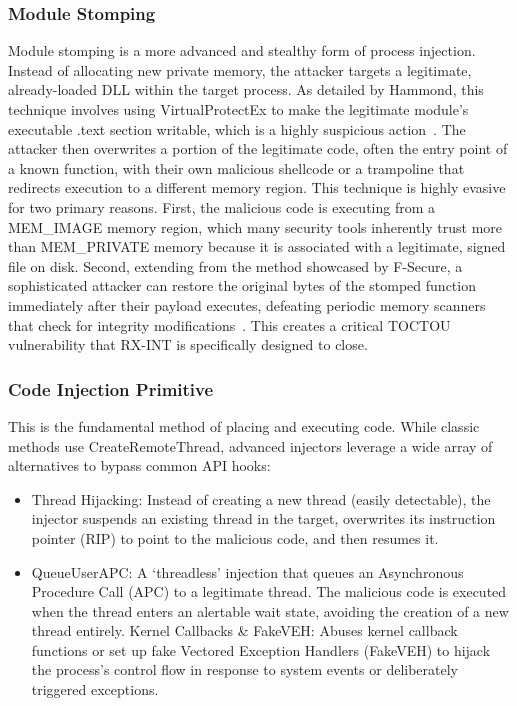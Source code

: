 \documentclass[journal]{IEEEtran}
\begin{document}
\subsubsection{Module Stomping}
Module stomping is a more advanced and stealthy form of process injection. Instead of allocating new private memory, the attacker targets a legitimate, already-loaded DLL within the target process. As detailed by Hammond, this technique involves using VirtualProtectEx to make the legitimate module's executable .text section writable, which is a highly suspicious action~\cite{Orr2019}. The attacker then overwrites a portion of the legitimate code, often the entry point of a known function, with their own malicious shellcode or a trampoline that redirects execution to a different memory region.
This technique is highly evasive for two primary reasons. First, the malicious code is executing from a MEM\_IMAGE memory region, which many security tools inherently trust more than MEM\_PRIVATE memory because it is associated with a legitimate, signed file on disk. Second, extending from the method showcased by F-Secure, a sophisticated attacker can restore the original bytes of the stomped function immediately after their payload executes, defeating periodic memory scanners that check for integrity modifications~\cite{Orr2019}. This creates a critical TOCTOU vulnerability that RX-INT is specifically designed to close.
\subsubsection{Code Injection Primitive}
This is the fundamental method of placing and executing code. While classic methods use CreateRemoteThread, advanced injectors leverage a wide array of alternatives to bypass common API hooks:
\begin{itemize}
\item Thread Hijacking: Instead of creating a new thread (easily detectable), the injector suspends an existing thread in the target, overwrites its instruction pointer (RIP) to point to the malicious code, and then resumes it.
\item QueueUserAPC: A `threadless' injection that queues an Asynchronous Procedure Call (APC) to a legitimate thread. The malicious code is executed when the thread enters an alertable wait state, avoiding the creation of a new thread entirely. Kernel Callbacks \& FakeVEH: Abuses kernel callback functions or set up fake Vectored Exception Handlers (FakeVEH) to hijack the process's control flow in response to system events or deliberately triggered exceptions.
\end{itemize}
\end{document}
